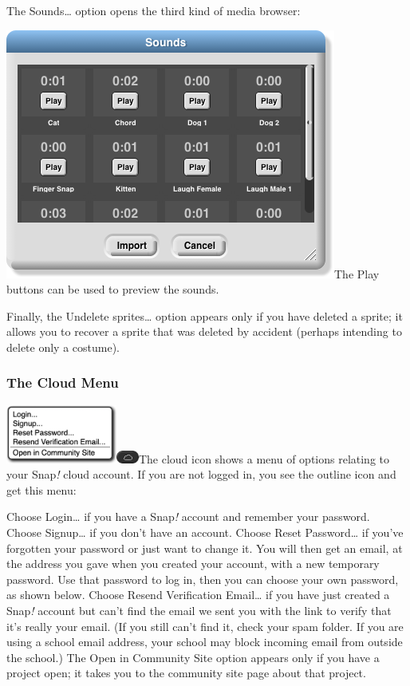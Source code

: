 The Sounds\ldots{} option opens the third kind of media browser:

\includegraphics[width=4.28125in,height=3.23958in]{media/image1002.png}The
Play buttons can be used to preview the sounds.

Finally, the Undelete sprites\ldots{} option appears only if you have
deleted a sprite; it allows you to recover a sprite that was deleted by
accident (perhaps intending to delete only a costume).

\subsubsection{The Cloud Menu}\label{the-cloud-menu}

\includegraphics[width=1.43681in,height=0.75972in]{media/image1003.png}\includegraphics[width=0.29167in,height=0.16667in]{media/image1004.png}The
cloud icon shows a menu of options relating to your Snap\emph{!} cloud
account. If you are not logged in, you see the outline icon and get this
menu:

Choose Login\ldots{} if you have a Snap\emph{!} account and remember
your password. Choose Signup\ldots{} if you don't have an account.
Choose Reset Password\ldots{} if you've forgotten your password or just
want to change it. You will then get an email, at the address you gave
when you created your account, with a new temporary password. Use that
password to log in, then you can choose your own password, as shown
below. Choose Resend Verification Email\ldots{} if you have just created
a Snap\emph{!} account but can't find the email we sent you with the
link to verify that it's really your email. (If you still can't find it,
check your spam folder. If you are using a school email address, your
school may block incoming email from outside the school.) The Open in
Community Site option appears only if you have a project open; it takes
you to the community site page about that project.


